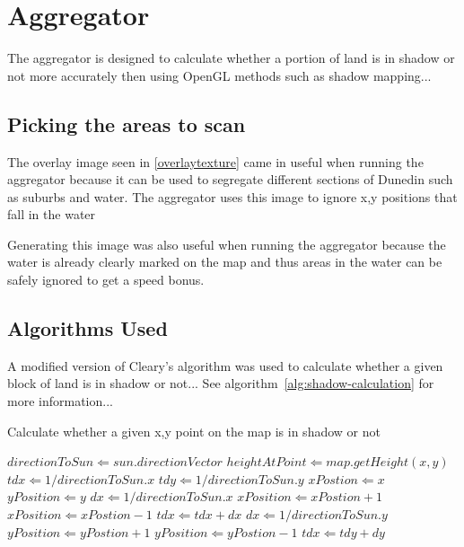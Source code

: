 \documentclass[12pt]{report}
\begin{document}
\chapter{Aggregator}
The aggregator is designed to calculate whether a portion of land is in shadow or not more accurately then using OpenGL methods such as shadow mapping...


\section{Picking the areas to scan}
The overlay image seen in \ref{overlaytexture} came in useful when running the aggregator because it can be used to segregate different sections of Dunedin such as suburbs and water. The aggregator uses this image to ignore x,y positions that fall in the water 

Generating this image was also useful when running the aggregator because the water is already clearly marked on the map and thus areas in the water can be safely ignored to get a speed bonus. 



\section{Algorithms Used}
A modified version of Cleary's algorithm was used to calculate whether a given block of land is in shadow or not... See algorithm~\ref{alg:shadow-calculation} for more information... 



\begin{algorithm}[h]
\caption{Calculate whether a given x,y point on the map is in shadow or not}
\label{alg:shadow-calculation}%
\begin{algorithmic}           %
\STATE $directionToSun \Leftarrow sun.directionVector$
\STATE $heightAtPoint \Leftarrow map.getHeight(x,y)$
\STATE $tdx \Leftarrow 1 / directionToSun.x$
\STATE $tdy \Leftarrow 1 / directionToSun.y$
\STATE $xPostion \Leftarrow x$
\STATE $yPosition \Leftarrow y$
	\ENDIF
		\STATE $dx \Leftarrow 1 / directionToSun.x$
			\STATE $xPosition \Leftarrow xPostion + 1$	
		\ELSE
			\STATE $xPosition \Leftarrow xPostion - 1$	
		\ENDIF
		\STATE $tdx \Leftarrow tdx + dx$
	\ELSE
		\STATE $dx \Leftarrow 1 / directionToSun.y$
			\STATE $yPosition \Leftarrow yPostion + 1$	
		\ELSE
			\STATE $yPosition \Leftarrow yPostion - 1$	
		\ENDIF
		\STATE $tdx \Leftarrow tdy + dy$		
	\ENDIF
\ENDWHILE
{}
\end{algorithmic}
\end{algorithm}
\end{document}
